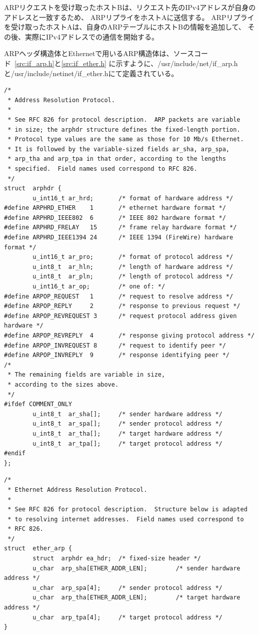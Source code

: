 ARPリクエストを受け取ったホストBは、リクエスト先のIPv4アドレスが自身のアドレスと一致するため、
ARPリプライをホストAに送信する。
ARPリプライを受け取ったホストAは、自身のARPテーブルにホストBの情報を追加して、
その後、実際にIPv4アドレスでの通信を開始する。

ARPヘッダ構造体とEthernetで用いるARP構造体は、ソースコード~\ref{src:if_arp.h}と\ref{src:if_ether.h}
に示すように、/usr/include/net/if\_arp.hと/usr/include/netinet/if\_ether.hにて定義されている。

\begin{lstlisting}[caption=ARP構造体 (/usr/include/net/if\_arp.h),label=src:if_arp.h]
/*
 * Address Resolution Protocol.
 *
 * See RFC 826 for protocol description.  ARP packets are variable
 * in size; the arphdr structure defines the fixed-length portion.
 * Protocol type values are the same as those for 10 Mb/s Ethernet.
 * It is followed by the variable-sized fields ar_sha, arp_spa,
 * arp_tha and arp_tpa in that order, according to the lengths
 * specified.  Field names used correspond to RFC 826.
 */
struct  arphdr {
        u_int16_t ar_hrd;       /* format of hardware address */
#define ARPHRD_ETHER    1       /* ethernet hardware format */
#define ARPHRD_IEEE802  6       /* IEEE 802 hardware format */
#define ARPHRD_FRELAY   15      /* frame relay hardware format */
#define ARPHRD_IEEE1394 24      /* IEEE 1394 (FireWire) hardware format */
        u_int16_t ar_pro;       /* format of protocol address */
        u_int8_t  ar_hln;       /* length of hardware address */
        u_int8_t  ar_pln;       /* length of protocol address */
        u_int16_t ar_op;        /* one of: */
#define ARPOP_REQUEST   1       /* request to resolve address */
#define ARPOP_REPLY     2       /* response to previous request */
#define ARPOP_REVREQUEST 3      /* request protocol address given hardware */
#define ARPOP_REVREPLY  4       /* response giving protocol address */
#define ARPOP_INVREQUEST 8      /* request to identify peer */
#define ARPOP_INVREPLY  9       /* response identifying peer */
/*
 * The remaining fields are variable in size,
 * according to the sizes above.
 */
#ifdef COMMENT_ONLY
        u_int8_t  ar_sha[];     /* sender hardware address */
        u_int8_t  ar_spa[];     /* sender protocol address */
        u_int8_t  ar_tha[];     /* target hardware address */
        u_int8_t  ar_tpa[];     /* target protocol address */
#endif
};
\end{lstlisting}

\begin{lstlisting}[caption=Ethernet用ARP構造体 (/usr/include/netinet/if\_ether.h),label=src:if_ether.h]
/*
 * Ethernet Address Resolution Protocol.
 *
 * See RFC 826 for protocol description.  Structure below is adapted
 * to resolving internet addresses.  Field names used correspond to
 * RFC 826.
 */
struct  ether_arp {
        struct  arphdr ea_hdr;  /* fixed-size header */
        u_char  arp_sha[ETHER_ADDR_LEN];        /* sender hardware address */
        u_char  arp_spa[4];     /* sender protocol address */
        u_char  arp_tha[ETHER_ADDR_LEN];        /* target hardware address */
        u_char  arp_tpa[4];     /* target protocol address */
}
\end{lstlisting}

